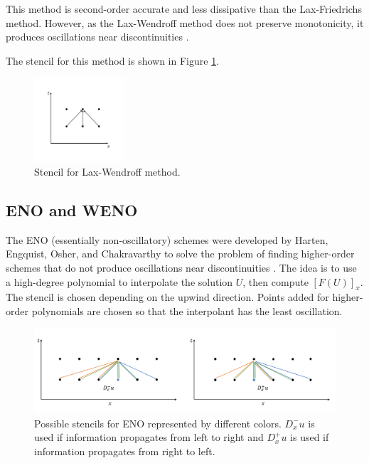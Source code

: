 \documentclass[letterpaper]{article}
\begin{document}
This method is second-order accurate and less dissipative than the Lax-Friedrichs method.  However, as the Lax-Wendroff method does not preserve monotonicity, it produces oscillations near discontinuities \cite{LeVequetext}. 

The stencil for this method is shown in Figure 
\ref{fig:stencil_laxwend}. \\

\begin{figure}[H]
\centering
\includegraphics[trim = 10mm 20mm 10mm 15mm, width=0.3\textwidth]{Laxwend.png}
\caption{Stencil for Lax-Wendroff method.}
\label{fig:stencil_laxwend}
\end{figure}


\subsection{ENO and WENO}

The ENO (essentially non-oscillatory) schemes were developed by Harten, Engquist, Osher, and Chakravarthy to solve the problem of finding higher-order schemes that do not produce oscillations near discontinuities \cite{LeVequetext}. The idea is to use a high-degree polynomial to  interpolate the solution $U$, then compute $[F(U)]_x$. The stencil is chosen depending on the upwind direction. Points added for higher-order polynomials are chosen so that the interpolant has the least oscillation.

\begin{figure}[H]
\centering
\includegraphics[width=160mm]{ENO.png}
\caption{Possible stencils for ENO represented by different colors. $D^-_x u$ is used if information propagates from left to right and $D^+_x u$ is used if information propagates from right to left.}
\label{fig:stencil_ENO}
\end{figure}
\end{document}
